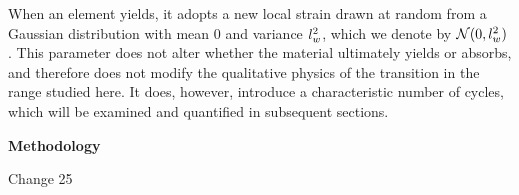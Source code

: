 \documentclass[asymmetricmargins]{library/duthesis}%
\newcommand{\DiffReportBodyFont}{\small}
\newcommand{\DiffReportLocationFont}{\large\bfseries}
\newcommand{\DiffReportMetaFont}{\small\ttfamily}
\newcommand{\DiffReportLocation}[1]{%
  \Needspace{4\baselineskip}%
  \par\medskip
  {\DiffReportLocationFont #1\par}
}
\newcommand{\DiffReportChange}[1]{%
  \Needspace{4\baselineskip}%
  \par\smallskip
  {\DiffReportMetaFont Change #1\par}
  \smallskip
}
\newenvironment{DiffReportContent}
  {\begingroup\DiffReportBodyFont}
  {\par\endgroup\medskip}
\providecommand{\DIFaddend}{} %
\begin{document}
\begin{DiffReportContent}
\DIFaddend 

When an element yields, it adopts a new local strain drawn at random from a Gaussian distribution with mean $0$ and variance $l_w^2$, which we denote by $\mathcal{N}(0,l_w^2)$. This parameter does not alter whether the material ultimately yields or absorbs, and therefore does not modify the qualitative physics of the transition in the range studied here. It does, however, introduce a characteristic number of cycles, which will be examined and quantified in subsequent sections. 
\end{DiffReportContent}
\DiffReportLocation{Methodology}
\DiffReportChange{25}
\end{document}
